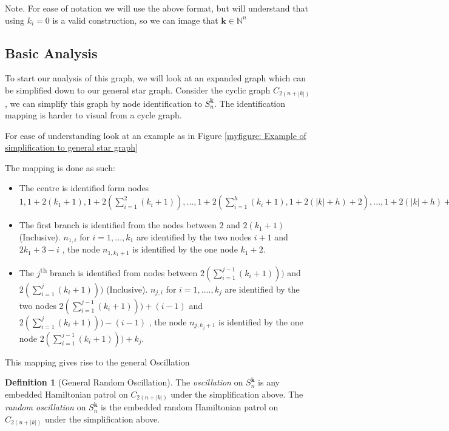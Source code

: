 \documentclass[a4paper,10pt]{article}
\theoremstyle{definition}
\newtheorem{definition}[theorem]{Definition}
\theoremstyle{definition}
\theoremstyle{remark}
\theoremstyle{definition}
\begin{document}
Note. For ease of notation we will use the above format, but will understand that using $k_{i}=0$ is a valid construction, so we can image that $\bm{k} \in \mathbb{N}^n$


\subsection{Basic Analysis}
To start our analysis of this graph, we will look at an expanded graph which can be simplified down to our general star graph. Consider the cyclic graph $C_{2(n+|k|)}$ , we can simplify this graph by node identification to $S^{\bm{k}}_{n}$. The identification mapping is harder to visual from a cycle graph.

For ease of understanding look at an example as in Figure \ref{myfigure: Example of simplification to general star graph}

The mapping is done as such:
\begin{itemize}
\item The centre is identified form nodes $1,1+2(k_{1}+1),1+2(\sum\limits_{i=1}^{2} (k_{i}+1)),...,1+2(\sum\limits_{i=1}^{h}(k_{i}+1),1+2(|k|+h)+2),...,1+2(|k|+h)+2(n-h)$

\item The first branch is identified from the nodes between $2$ and $2(k_{1}+1)$ (Inclusive). $n_{1,i}$ for $i=1,...,k_{1}$ are identified by the two nodes $i+1$ and $2k_{1}+3-i$ , the node $n_{1,k_{1}+1}$ is identified by the one node $k_{1}+2$.

\item The $j$\textsuperscript{th} branch is identified from nodes between $2(\sum\limits_{i=1}^{j-1} (k_{i}+1)))$ and $2(\sum\limits_{i=1}^{j} (k_{i}+1)))$ (Inclusive). $n_{j,i}$ for $i=1,....,k_{j}$ are identified by the two nodes $2(\sum\limits_{i=1}^{j-1} (k_{i}+1)))+(i-1)$ and $2(\sum\limits_{i=1}^{j} (k_{i}+1)))-(i-1)$ , the node $n_{j,k_{j}+1}$ is identified by the one node $2(\sum\limits_{i=1}^{j-1} (k_{i}+1)))+k_{j}$.
\end{itemize}

This mapping gives rise to the general Oscillation

\begin{definition}[General Random Oscillation]
The \textit{oscillation} on $S^{\bm{k}}_{n}$ is any embedded Hamiltonian patrol on $C_{2(n+|k|)}$ under the simplification above. The \textit{random oscillation} on $S^{\bm{k}}_{n}$ is the embedded random Hamiltonian patrol on $C_{2(n+|k|)}$ under the simplification above.
\end{definition}
\end{document}

